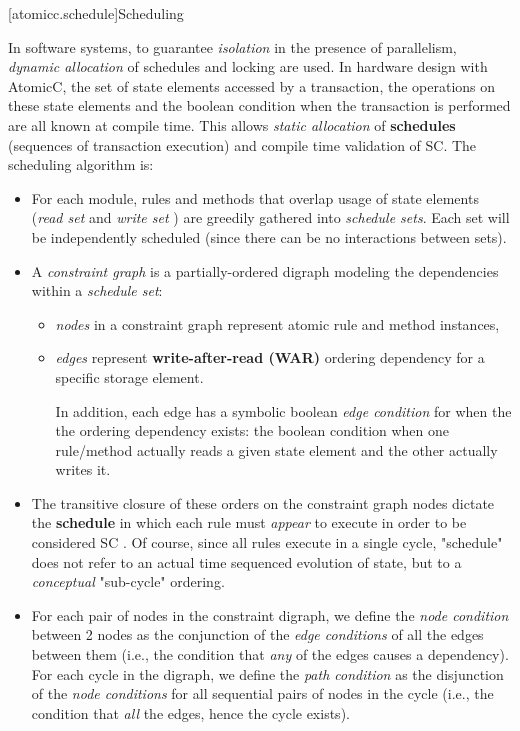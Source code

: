 [atomicc.schedule]{Scheduling}

In software systems, to guarantee \textit{isolation} in the presence of
parallelism, \textit{dynamic allocation}\cite[p.~377]{GrayR93} of schedules
and locking\cite[Sec.~11.2]{OV11} are used.
In hardware design with AtomicC,
the set of state elements accessed by a transaction,
the operations on these state elements
and the boolean condition when the transaction is performed
are all known at compile time.
This allows \textit{static allocation}\cite[Sec.~7.3.1]{GrayR93} of \textbf{schedules}
(sequences of transaction execution)
and compile time validation of SC.
The scheduling algorithm is:
\begin{itemize}
\item For each module, rules and methods that overlap usage of state elements
(\textit{read set} and \textit{write set}\cite[Sec.~10.1.2]{OV11} \cite{RosenkrantzSternsLewis})
are greedily gathered into \textit{schedule sets}.
Each set will be independently scheduled (since
there can be no interactions between sets).
\item A \textit{constraint graph} is a partially-ordered digraph modeling
the dependencies within a \textit{schedule set}:
\begin{itemize}
\item \textit{nodes} in a constraint graph represent atomic rule and method instances,
\item \textit{edges} represent \textbf{write-after-read (WAR)} ordering dependency
for a specific storage element\cite[Sec.~3]{Cain2003}.

In addition, each edge has a symbolic boolean \textit{edge condition} for when the
the ordering dependency exists: the boolean
condition when one rule/method actually reads a given state element
and the other actually writes it.
\end{itemize}

\item The transitive closure of these orders on the constraint graph nodes
dictate the \textbf{schedule} in which each rule must \textit{appear} to execute in
order to be considered SC
\cite[Sec.~11.1]{OV11}.
Of course, since all rules execute in a single cycle, "schedule" does not
refer to an actual time sequenced evolution of state,
but to a \textit{conceptual} "sub-cycle" ordering.

\item For each pair of nodes in the constraint digraph, we define the \textit{node condition}
between 2 nodes as the conjunction of the \textit{edge conditions} of all the edges between
them (i.e., the condition that \textit{any} of the edges causes a dependency).
For each cycle in the digraph, we define the \textit{path condition}
as the disjunction of the \textit{node conditions} for all sequential pairs of nodes
in the cycle (i.e., the condition that \textit{all} the edges, hence the cycle exists).


\end{itemize}
